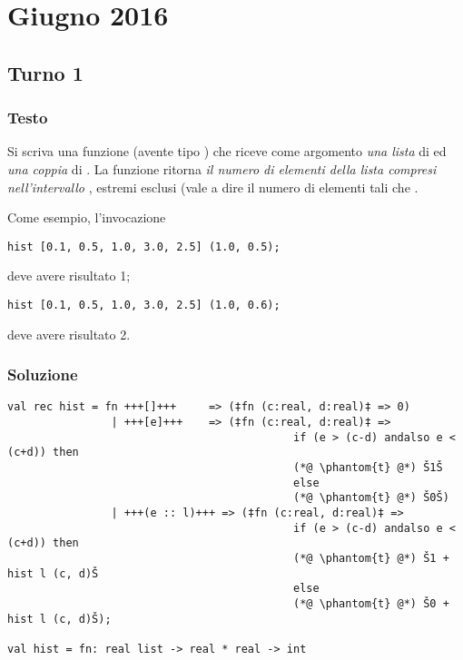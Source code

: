 \section{Giugno 2016}

\subsection{Turno 1}

\subsubsection{Testo}

Si scriva una funzione  (avente tipo ) che riceve come argomento \emph{una lista} di  ed \emph{una coppia} di .
La funzione  ritorna \emph{il numero di elementi della lista compresi nell'intervallo }, estremi esclusi (vale a dire il numero di elementi  tali che .

\medskip
Come esempio, l'invocazione

\begin{lstlisting}
hist [0.1, 0.5, 1.0, 3.0, 2.5] (1.0, 0.5);
\end{lstlisting}

deve avere risultato 1;

\begin{lstlisting}
hist [0.1, 0.5, 1.0, 3.0, 2.5] (1.0, 0.6);
\end{lstlisting}

deve avere risultato 2.

\subsubsection{Soluzione}

\begin{lstlisting}[style = SML, caption = {Definizione della funzione \sml{hist}}]
val rec hist = fn +++[]+++	   => (‡fn (c:real, d:real)‡ => 0)
				| +++[e]+++	   => (‡fn (c:real, d:real)‡ =>
											if (e > (c-d) andalso e < (c+d)) then
							 				(*@ \phantom{t} @*) Š1Š
											else
											(*@ \phantom{t} @*) Š0Š)
				| +++(e :: l)+++ => (‡fn (c:real, d:real)‡ =>
											if (e > (c-d) andalso e < (c+d)) then
											(*@ \phantom{t} @*) Š1 + hist l (c, d)Š
											else
											(*@ \phantom{t} @*) Š0 + hist l (c, d)Š);

val hist = fn: real list -> real * real -> int
\end{lstlisting}

